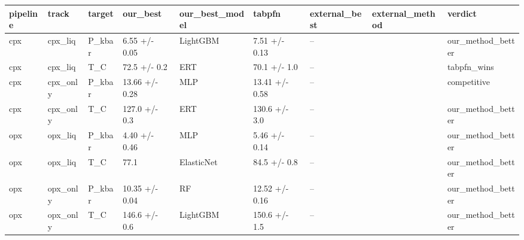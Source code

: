 \begin{tabular}{lllllllll}
\toprule
pipeline & track & target & our\_best & our\_best\_model & tabpfn & external\_best & external\_method & verdict \\
\midrule
cpx & cpx\_liq & P\_kbar & 6.55 +/- 0.05 & LightGBM & 7.51 +/- 0.13 & -- &  & our\_method\_better \\
cpx & cpx\_liq & T\_C & 72.5 +/- 0.2 & ERT & 70.1 +/- 1.0 & -- &  & tabpfn\_wins \\
cpx & cpx\_only & P\_kbar & 13.66 +/- 0.28 & MLP & 13.41 +/- 0.58 & -- &  & competitive \\
cpx & cpx\_only & T\_C & 127.0 +/- 0.3 & ERT & 130.6 +/- 3.0 & -- &  & our\_method\_better \\
opx & opx\_liq & P\_kbar & 4.40 +/- 0.46 & MLP & 5.46 +/- 0.14 & -- &  & our\_method\_better \\
opx & opx\_liq & T\_C & 77.1 & ElasticNet & 84.5 +/- 0.8 & -- &  & our\_method\_better \\
opx & opx\_only & P\_kbar & 10.35 +/- 0.04 & RF & 12.52 +/- 0.16 & -- &  & our\_method\_better \\
opx & opx\_only & T\_C & 146.6 +/- 0.6 & LightGBM & 150.6 +/- 1.5 & -- &  & our\_method\_better \\
\bottomrule
\end{tabular}
